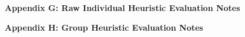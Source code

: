 \documentclass{article}
\begin{document}
\newpage	
{}
\vspace*{40mm}
\begin{centering}
	{\huge\bfseries Appendix G: Raw Individual Heuristic Evaluation Notes}\\[0.4cm] 
\end{centering}





\newpage	
{}
\vspace*{40mm}
\begin{centering}
	{\huge\bfseries Appendix H: Group Heuristic Evaluation Notes}\\[0.4cm] 
\end{centering}
\end{document}
